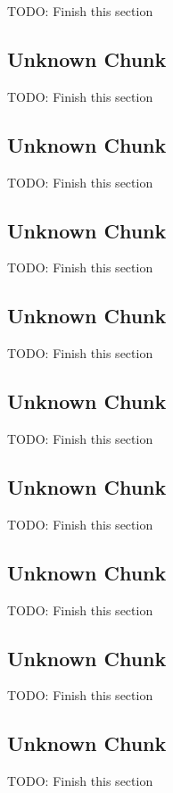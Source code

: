 TODO: Finish this section

\subsection{Unknown Chunk}
\label{subsec:pfmapcchunkcube}

TODO: Finish this section

\subsection{Unknown Chunk}
\label{subsec:pfmapcchunkdcal}

TODO: Finish this section

\subsection{Unknown Chunk}
\label{subsec:pfmapcchunkenv}

TODO: Finish this section

\subsection{Unknown Chunk}
\label{subsec:pfmapcchunklght}

TODO: Finish this section

\subsection{Unknown Chunk}
\label{subsec:pfmapcchunkprp2}

TODO: Finish this section

\subsection{Unknown Chunk}
\label{subsec:pfmapcchunkrive}

TODO: Finish this section

\subsection{Unknown Chunk}
\label{subsec:pfmapcchunkshex}

TODO: Finish this section

\subsection{Unknown Chunk}
\label{subsec:pfmapcchunktrn}

TODO: Finish this section

\subsection{Unknown Chunk}
\label{subsec:pfmapcchunkzon2}

TODO: Finish this section



